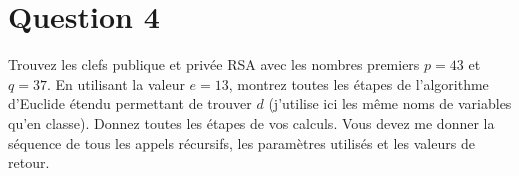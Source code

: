 \documentclass[devoir4.tex]{subfiles}
\begin{document}
\section*{Question 4}
Trouvez les clefs publique et privée RSA avec les nombres premiers \(p = 43\) et \(q = 37\). En utilisant la valeur \(e = 13\), montrez toutes les étapes de l'algorithme d'Euclide étendu permettant de trouver \(d\) (j'utilise ici les même noms de variables qu'en classe). Donnez toutes les étapes de vos calculs. Vous devez me donner la séquence de tous les appels récursifs, les paramètres utilisés et les valeurs de retour.
\end{document}
